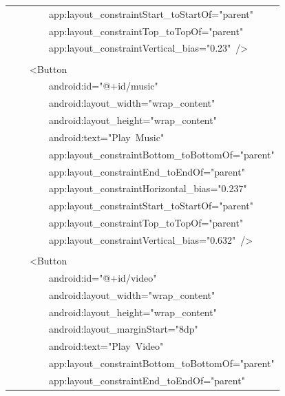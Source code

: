 \documentclass[a4paper,12pt]{article}
\begin{document}
\begin{longtable}{|p{}|}
{\ttfamily\small \ \ \ \ \ \ \ \ app:layout\_constraintStart\_toStartOf="parent"} \\
{\ttfamily\small \ \ \ \ \ \ \ \ app:layout\_constraintTop\_toTopOf="parent"} \\
{\ttfamily\small \ \ \ \ \ \ \ \ app:layout\_constraintVertical\_bias="0.23"\ /\textgreater{}} \\
\strut \\
{\ttfamily\small \ \ \ \ \textless{}Button} \\
{\ttfamily\small \ \ \ \ \ \ \ \ android:id="@+id/music"} \\
{\ttfamily\small \ \ \ \ \ \ \ \ android:layout\_width="wrap\_content"} \\
{\ttfamily\small \ \ \ \ \ \ \ \ android:layout\_height="wrap\_content"} \\
{\ttfamily\small \ \ \ \ \ \ \ \ android:text="Play\ Music"} \\
{\ttfamily\small \ \ \ \ \ \ \ \ app:layout\_constraintBottom\_toBottomOf="parent"} \\
{\ttfamily\small \ \ \ \ \ \ \ \ app:layout\_constraintEnd\_toEndOf="parent"} \\
{\ttfamily\small \ \ \ \ \ \ \ \ app:layout\_constraintHorizontal\_bias="0.237"} \\
{\ttfamily\small \ \ \ \ \ \ \ \ app:layout\_constraintStart\_toStartOf="parent"} \\
{\ttfamily\small \ \ \ \ \ \ \ \ app:layout\_constraintTop\_toTopOf="parent"} \\
{\ttfamily\small \ \ \ \ \ \ \ \ app:layout\_constraintVertical\_bias="0.632"\ /\textgreater{}} \\
\strut \\
{\ttfamily\small \ \ \ \ \textless{}Button} \\
{\ttfamily\small \ \ \ \ \ \ \ \ android:id="@+id/video"} \\
{\ttfamily\small \ \ \ \ \ \ \ \ android:layout\_width="wrap\_content"} \\
{\ttfamily\small \ \ \ \ \ \ \ \ android:layout\_height="wrap\_content"} \\
{\ttfamily\small \ \ \ \ \ \ \ \ android:layout\_marginStart="8dp"} \\
{\ttfamily\small \ \ \ \ \ \ \ \ android:text="Play\ Video"} \\
{\ttfamily\small \ \ \ \ \ \ \ \ app:layout\_constraintBottom\_toBottomOf="parent"} \\
{\ttfamily\small \ \ \ \ \ \ \ \ app:layout\_constraintEnd\_toEndOf="parent"} \\

\end{longtable}
\end{document}
